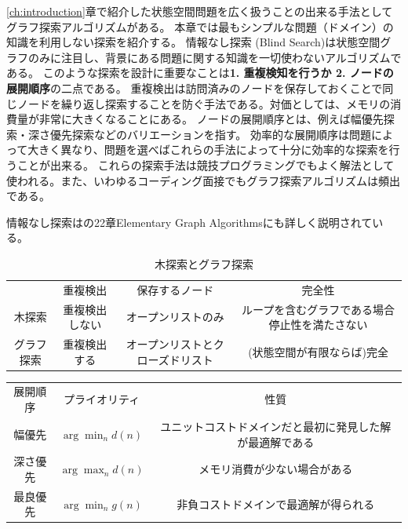 \documentclass[10pt]{book}
\begin{document}
\ref{ch:introduction}章で紹介した状態空間問題を広く扱うことの出来る手法としてグラフ探索アルゴリズムがある。
本章では最もシンプルな問題（ドメイン）の知識を利用しない探索を紹介する。
情報なし探索 (Blind Search)は状態空間グラフのみに注目し、背景にある問題に関する知識を一切使わないアルゴリズムである。
このような探索を設計に重要なことは{\bf 1. 重複検知を行うか 2. ノードの展開順序}の二点である。
重複検出は訪問済みのノードを保存しておくことで同じノードを繰り返し探索することを防ぐ手法である。対価としては、メモリの消費量が非常に大きくなることにある。
ノードの展開順序とは、例えば幅優先探索・深さ優先探索などのバリエーションを指す。
効率的な展開順序は問題によって大きく異なり、問題を選べばこれらの手法によって十分に効率的な探索を行うことが出来る。
これらの探索手法は競技プログラミングでもよく解法として使われる\cite{skiena2006programming}。また、いわゆるコーディング面接でもグラフ探索アルゴリズムは頻出である\cite{mcdowell2011cracking}。

情報なし探索は\cite{cormen01}の22章Elementary Graph Algorithmsにも詳しく説明されている。


\begin{table}
\caption{木探索とグラフ探索}
\label{tbl:tree-vs-graph-search}
\begin{tabular}{c|ccc}
				& 重複検出  	  & 保存するノード & 完全性 \\
	木探索  		& 重複検出しない & オープンリストのみ & ループを含むグラフである場合停止性を満たさない \\
	グラフ探索 		& 重複検出する  & オープンリストとクローズドリスト & (状態空間が有限ならば)完全 \\ 
\end{tabular}
\end{table}


\begin{table}
\label{tbl:basic-priority}
\begin{tabular}{c|cc}
	展開順序  	& プライオリティ 	& 性質 \\  
	幅優先	& $\arg \min_n d(n)$ & ユニットコストドメインだと最初に発見した解が最適解である \\
	深さ優先 	& $\arg \max_n d(n)$ & メモリ消費が少ない場合がある \\
	最良優先	& $\arg \min_n g(n)$ & 非負コストドメインで最適解が得られる \\
\end{tabular}
\end{table}
\end{document}
